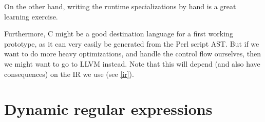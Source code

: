 \documentclass[11pt,a4paper]{report}
\begin{document}
On the other hand, writing the runtime specializations by hand is a great learning exercise.

Furthermore, C might be a good destination language for a first working prototype, as it can very easily be generated from the Perl script AST. But if we want to do more heavy optimizations, and handle the control flow ourselves, then we might want to go to LLVM instead. Note that this will depend (and also have consequences) on the IR we use (see \ref{ir}).

\section{Dynamic regular expressions}
\end{document}
